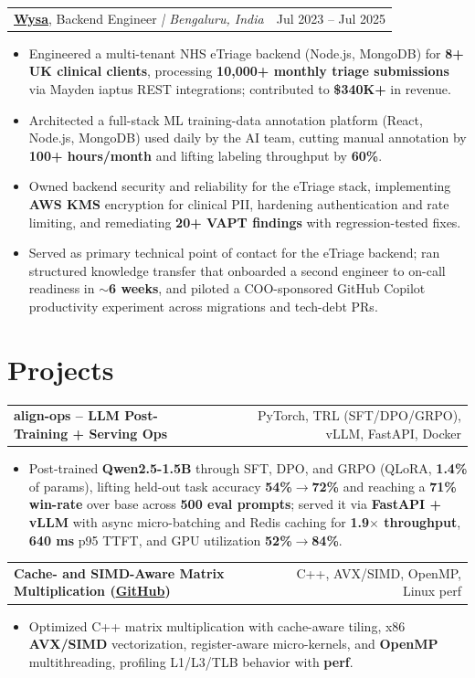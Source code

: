 \documentclass[letterpaper,11pt]{article}
\makeatletter
\newcommand{\expItem}[4]{%
  \vspace{2pt}
  \begin{tabular*}{\textwidth}{@{}l@{\extracolsep{\fill}}r@{}}
    \textbf{#1}, #2 \textit{| #3} & #4 \\
  \end{tabular*}\par\vspace{-3pt}
}
\newcommand{\projItem}[2]{%
  \vspace{2pt}
  \begin{tabular*}{\textwidth}{@{}l@{\extracolsep{\fill}}r@{}}
    \textbf{#1} & #2 \\
  \end{tabular*}\par\vspace{-3pt}
}
\makeatother
\begin{document}
\expItem{\href{https://www.wysa.io}{Wysa}}{Backend Engineer}{Bengaluru, India}{Jul 2023 -- Jul 2025}
\begin{itemize}
  \item Engineered a multi-tenant NHS eTriage backend (Node.js, MongoDB) for \textbf{8+ UK clinical clients}, processing \textbf{10{,}000+ monthly triage submissions} via Mayden iaptus REST integrations; contributed to \textbf{\$340K+} in revenue.
  \item Architected a full-stack ML training-data annotation platform (React, Node.js, MongoDB) used daily by the AI team, cutting manual annotation by \textbf{100+ hours/month} and lifting labeling throughput by \textbf{60\%}.
  \item Owned backend security and reliability for the eTriage stack, implementing \textbf{AWS KMS} encryption for clinical PII, hardening authentication and rate limiting, and remediating \textbf{20+ VAPT findings} with regression-tested fixes.
  \item Served as primary technical point of contact for the eTriage backend; ran structured knowledge transfer that onboarded a second engineer to on-call readiness in \textbf{$\sim$6 weeks}, and piloted a COO-sponsored GitHub Copilot productivity experiment across migrations and tech-debt PRs.
\end{itemize}

\section{Projects}

\projItem{align-ops -- LLM Post-Training + Serving Ops}{PyTorch, TRL (SFT/DPO/GRPO), vLLM, FastAPI, Docker}
\begin{itemize}
  \item Post-trained \textbf{Qwen2.5-1.5B} through SFT, DPO, and GRPO (QLoRA, \textbf{1.4\%} of params), lifting held-out task accuracy \textbf{54\%$\to$72\%} and reaching a \textbf{71\% win-rate} over base across \textbf{500 eval prompts}; served it via \textbf{FastAPI + vLLM} with async micro-batching and Redis caching for \textbf{1.9$\times$ throughput}, \textbf{640 ms} p95 TTFT, and GPU utilization \textbf{52\%$\to$84\%}.
\end{itemize}

\projItem{Cache- and SIMD-Aware Matrix Multiplication {\normalfont\small(\href{https://github.com/Deva-1903/cs690pf}{GitHub})}}{C++, AVX/SIMD, OpenMP, Linux perf}
\begin{itemize}
  \item Optimized C++ matrix multiplication with cache-aware tiling, x86 \textbf{AVX/SIMD} vectorization, register-aware micro-kernels, and \textbf{OpenMP} multithreading, profiling L1/L3/TLB behavior with \textbf{perf}.
\end{itemize}
\end{document}
